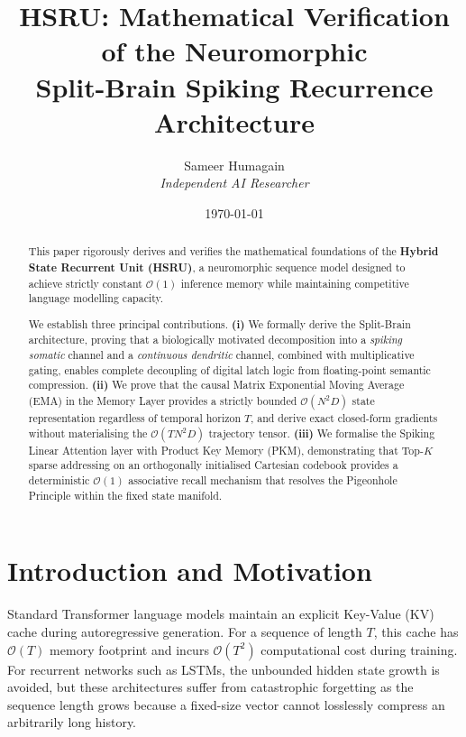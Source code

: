 \documentclass[11pt]{article}
\title{%
    \textbf{HSRU: Mathematical Verification of the Neuromorphic\\
    Split-Brain Spiking Recurrence Architecture}%
}
\author{%
    Sameer Humagain \\[4pt]
    \textit{Independent AI Researcher}%
}
\date{\today}
\begin{document}
\maketitle
\thispagestyle{empty}

\begin{abstract}
\noindent
This paper rigorously derives and verifies the mathematical foundations of the \textbf{Hybrid State Recurrent Unit (HSRU)}, a neuromorphic sequence model designed to achieve strictly constant $\mathcal{O}(1)$ inference memory while maintaining competitive language modelling capacity.

We establish three principal contributions.
\textbf{(i)} We formally derive the Split-Brain architecture, proving that a biologically motivated decomposition into a \emph{spiking somatic} channel and a \emph{continuous dendritic} channel, combined with multiplicative gating, enables complete decoupling of digital latch logic from floating-point semantic compression.
\textbf{(ii)} We prove that the causal Matrix Exponential Moving Average (EMA) in the Memory Layer provides a strictly bounded $\mathcal{O}(N^2 D)$ state representation regardless of temporal horizon $T$, and derive exact closed-form gradients without materialising the $\mathcal{O}(T N^2 D)$ trajectory tensor.
\textbf{(iii)} We formalise the Spiking Linear Attention layer with Product Key Memory (PKM), demonstrating that Top-$K$ sparse addressing on an orthogonally initialised Cartesian codebook provides a deterministic $\mathcal{O}(1)$ associative recall mechanism that resolves the Pigeonhole Principle within the fixed state manifold.
\end{abstract}

\vspace{0.8cm}
\tableofcontents
\newpage
\setcounter{page}{1}

\section{Introduction and Motivation}
Standard Transformer language models maintain an explicit Key-Value (KV) cache during autoregressive generation. For a sequence of length $T$, this cache has $\mathcal{O}(T)$ memory footprint and incurs $\mathcal{O}(T^2)$ computational cost during training. For recurrent networks such as LSTMs, the unbounded hidden state growth is avoided, but these architectures suffer from catastrophic forgetting as the sequence length grows because a fixed-size vector cannot losslessly compress an arbitrarily long history.
\end{document}
